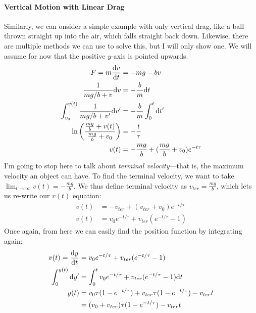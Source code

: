 \documentclass[a4paper]{article}
\begin{document}
\paragraph{Vertical Motion with Linear Drag}
Similarly, we can onsider a simple example with only vertical drag, like a ball
thrown straight up into the air, which falls straight back down. Likewise,
there are multiple methods we can use to solve this, but I will only show
one. We will assume for now that the positive $y$-axis is pointed upwards.
\begin{align*}
    F = m\frac{\mathrm{d} v}{\mathrm{d} t} &= -mg-bv\\
    \frac{1}{mg/b+v}\mathrm{d} v &= -\frac{b}{m}\mathrm{d} t\\
    \int_{v_0}^{v(t)}\frac{1}{mg/b+v'}\mathrm{d} v' &= -\frac{b}{m}\int_{0}^{t}\mathrm{d} t'\\
    \ln\left(\frac{\frac{mg}{b}+v(t)}{\frac{mg}{b}+v_0}\right)
    &= -\frac{t}{\tau}\\
    v(t) &= -\frac{mg}{b} + (\frac{mg}{b}+v_0)e^{-t\tau}
\end{align*}
I'm going to stop here to talk about \emph{terminal velocity}---that is, the
maximum velocity an object can have. To find the terminal velocity, we want to
take $\lim_{t\to\infty} v(t) = -\frac{mg}{b}$. We thus define terminal velocity
as $v_{ter} = \frac{mg}{b}$, which lets us re-write our $v(t)$ equation:
\begin{align*}
    v(t) &= -v_{ter} + (v_{ter}+v_0)e^{-t/\tau}\\
    v(t) &= v_0e^{-t/\tau} + v_{ter}(e^{-t/\tau}-1)
\end{align*}
Once again, from here we can easily find the position function by integrating
again:
\begin{align*}
    v(t) = \frac{\mathrm{d} y}{\mathrm{d} t} &= v_0e^{-t/\tau} + v_{ter}(e^{-t/\tau}-1)\\
    \int_0^{y(t)}\mathrm{d} y' &= \int_0^t v_0e^{-t/\tau} + v_{ter}(e^{-t/\tau}-1)\mathrm{d} t\\
    y(t) &= v_0\tau(1-e^{-t/\tau})+v_{ter}\tau(1-e^{-t/\tau})-v_{ter}t\\
    &= (v_0+v_{ter})\tau(1-e^{-t/\tau})-v_{ter}t
\end{align*}
\end{document}

